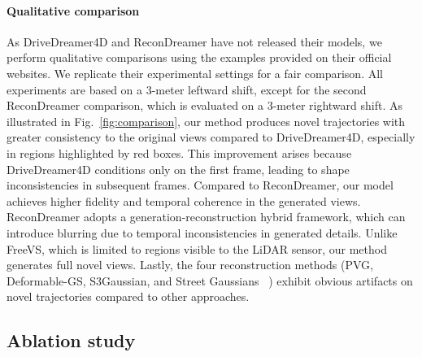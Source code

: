\paragraph{Qualitative comparison} As DriveDreamer4D and ReconDreamer have not released their models, we perform qualitative comparisons using the examples provided on their official websites. We replicate their experimental settings for a fair comparison. All experiments are based on a 3-meter leftward shift, except for the second ReconDreamer comparison, which is evaluated on a 3-meter rightward shift. As illustrated in Fig.~\ref{fig:comparison}, our method produces novel trajectories with greater consistency to the original views compared to DriveDreamer4D, especially in regions highlighted by red boxes. This improvement arises because DriveDreamer4D conditions only on the first frame, leading to shape inconsistencies in subsequent frames. Compared to ReconDreamer, our model achieves higher fidelity and temporal coherence in the generated views. ReconDreamer adopts a generation-reconstruction hybrid framework, which can introduce blurring due to temporal inconsistencies in generated details. Unlike FreeVS, which is limited to regions visible to the LiDAR sensor, our method generates full novel views. Lastly, the four reconstruction methods (PVG, Deformable-GS, S3Gaussian, and Street Gaussians ~\cite{yan2024street}) exhibit obvious artifacts on novel trajectories compared to other approaches. 







\subsection{Ablation study}



